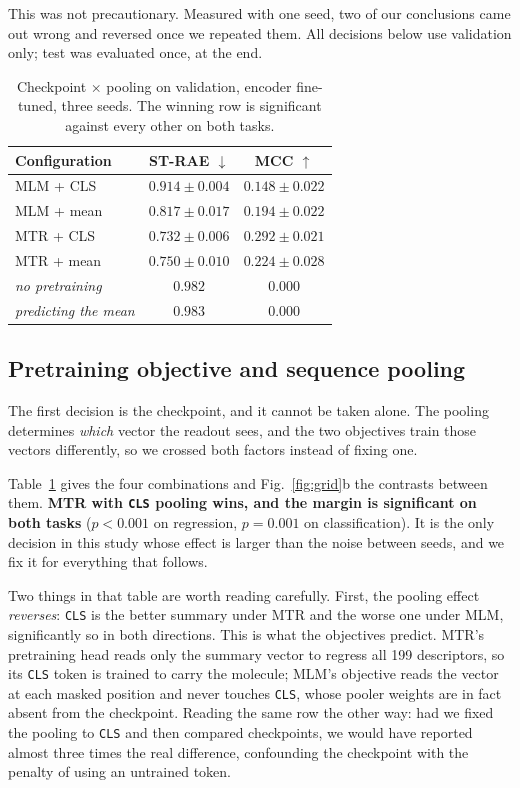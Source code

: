 \documentclass[10pt,twocolumn,a4paper]{article}
\begin{document}
This was not precautionary. Measured with one seed, two of our
conclusions came out wrong and reversed once we repeated them. All
decisions below use validation only; test was evaluated once, at the
end.

\begin{table}[t]
  \centering
  \caption{Checkpoint $\times$ pooling on validation, encoder
  fine-tuned, three seeds. The winning row is significant against every
  other on both tasks.}
  \label{tab:grid}
  \small
  \setlength{\tabcolsep}{4.5pt}
  \begin{tabular}{lcc}
    \toprule
    Configuration & ST-RAE $\downarrow$ & MCC $\uparrow$ \\
    \midrule
    MLM + CLS  & $0.914 \pm 0.004$ & $0.148 \pm 0.022$ \\
    MLM + mean & $0.817 \pm 0.017$ & $0.194 \pm 0.022$ \\
    MTR + CLS  & $\mathbf{0.732 \pm 0.006}$ & $\mathbf{0.292 \pm 0.021}$ \\
    MTR + mean & $0.750 \pm 0.010$ & $0.224 \pm 0.028$ \\
    \midrule
    \emph{no pretraining}     & $0.982$ & $0.000$ \\
    \emph{predicting the mean} & $0.983$ & $0.000$ \\
    \bottomrule
  \end{tabular}
\end{table}

\subsection{Pretraining objective and sequence pooling}

The first decision is the checkpoint, and it cannot be taken alone. The
pooling determines \emph{which} vector the readout sees, and the two
objectives train those vectors differently, so we crossed both factors
instead of fixing one.

Table~\ref{tab:grid} gives the four combinations and
Fig.~\ref{fig:grid}b the contrasts between them.
\textbf{MTR with \texttt{CLS} pooling wins, and the margin is
significant on both tasks} ($p < 0.001$ on regression, $p = 0.001$ on
classification). It is the only decision in this study whose effect is
larger than the noise between seeds, and we fix it for everything that
follows.

Two things in that table are worth reading carefully. First, the
pooling effect \emph{reverses}: \texttt{CLS} is the better summary
under MTR and the worse one under MLM, significantly so in both
directions. This is what the objectives predict. MTR's pretraining head
reads only the summary vector to regress all 199 descriptors, so its
\texttt{CLS} token is trained to carry the molecule; MLM's objective
reads the vector at each masked position and never touches
\texttt{CLS}, whose pooler weights are in fact absent from the
checkpoint. Reading the same row the other way: had we fixed the
pooling to \texttt{CLS} and then compared checkpoints, we would have
reported almost three times the real difference, confounding the
checkpoint with the penalty of using an untrained token.
\end{document}

